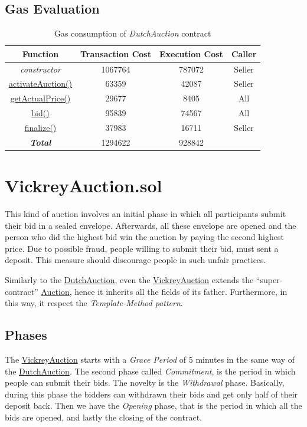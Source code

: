 \documentclass[runningheads,a4paper]{llncs}
\begin{document}
\subsection{Gas Evaluation}

\begin{table}
\setlength{\tabcolsep}{10pt}
\setlength{\abovecaptionskip}{10pt}
\centering
\begin{tabular}{| c | c | c | c |} 
 \hline
 \textbf{Function} & \textbf{Transaction Cost} & \textbf{Execution Cost} & \textbf{Caller} \\
 \hline
 \emph{constructor} & 1067764 & 787072 & Seller \\ 
 \hline
 \url{activateAuction()} & 63359 & 42087 & Seller \\ 
 \hline
 \url{getActualPrice()} & 29677 & 8405 & All \\ 
 \hline
 \url{bid()} & 95839 & 74567 & All \\ 
 \hline
 \url{finalize()} & 37983 & 16711 & Seller \\
 \hline
 \hline
 \hline
 \textbf{\emph{Total}} & 1294622 & 928842 & \\ \hline
\end{tabular}
\caption{Gas consumption of \emph{DutchAuction} contract}
\label{table:1}
\end{table}



\newpage
\section{VickreyAuction.sol}
This kind of auction involves an initial phase in which all participants submit their bid in a sealed envelope. Afterwards, all these envelope are opened and the person who did the highest bid win the auction by paying the second highest price. Due to possible fraud, people willing to submit their bid, must sent a deposit. This measure should discourage people in such unfair practices.

Similarly to the \url{DutchAuction}, even the \url{VickreyAuction} extends the ``super-contract'' \url{Auction}, hence it inherits all the fields of its father. Furthermore, in this way, it respect the \emph{Template-Method pattern}.  


\subsection{Phases}
The \url{VickreyAuction} starts with a \emph{Grace Period} of 5 minutes in the same way of the \url{DutchAuction}. The second phase called \emph{Commitment}, is the period in which people can submit their bids. The novelty is the \emph{Withdrawal} phase. Basically, during this phase the bidders can withdrawn their bids and get only half of their deposit back. Then we have the \emph{Opening} phase, that is the period in which all the bids are opened, and lastly the closing of the contract.
\end{document}
